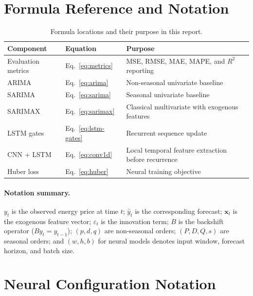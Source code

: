 \documentclass[12pt,a4paper]{article}
\begin{document}
\newpage
\begin{appendices}

\section{Formula Reference and Notation}\label{app:formula-reference}

\begin{table}[H]
\centering
\caption{Formula locations and their purpose in this report.}\label{tab:formula-reference}
\small
\begin{tabular}{@{}lll@{}}
\toprule
\textbf{Component} & \textbf{Equation} & \textbf{Purpose}\\
\midrule
Evaluation metrics   & Eq.~\eqref{eq:metrics}    & MSE, RMSE, MAE, MAPE, and $R^2$ reporting \\
ARIMA                & Eq.~\eqref{eq:arima}      & Non-seasonal univariate baseline \\
SARIMA               & Eq.~\eqref{eq:sarima}     & Seasonal univariate baseline \\
SARIMAX              & Eq.~\eqref{eq:sarimax}    & Classical multivariate with exogenous features \\
LSTM gates           & Eq.~\eqref{eq:lstm-gates} & Recurrent sequence update \\
CNN + LSTM           & Eq.~\eqref{eq:conv1d}     & Local temporal feature extraction before recurrence \\
Huber loss           & Eq.~\eqref{eq:huber}      & Neural training objective \\
\bottomrule
\end{tabular}
\end{table}

\paragraph{Notation summary.} $y_t$ is the observed energy price at time $t$; $\hat{y}_t$ is the corresponding forecast; $\mathbf{x}_t$ is the exogenous feature vector; $\varepsilon_t$ is the innovation term; $B$ is the backshift operator ($By_t = y_{t-1}$); $(p,d,q)$ are non-seasonal orders; $(P,D,Q,s)$ are seasonal orders; and $(w,h,b)$ for neural models denotes input window, forecast horizon, and batch size.

\section{Neural Configuration Notation}\label{app:configuration-notation}


\end{appendices}
\end{document}
